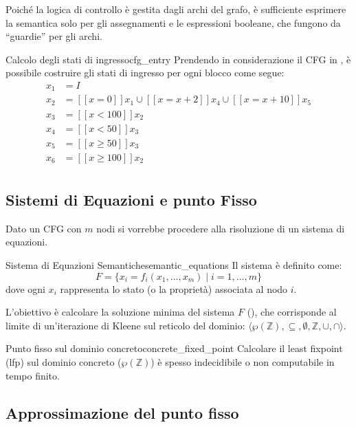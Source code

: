 Poiché la logica di controllo è gestita dagli archi del grafo, è sufficiente
esprimere la semantica solo per gli assegnamenti e le espressioni booleane,
che fungono da ``guardie'' per gli archi.


\begin{esempio}{Calcolo degli stati di ingresso}{cfg_entry}
Prendendo in considerazione il CFG in , è possibile costruire
gli stati di ingresso per ogni blocco come segue:
\[
\begin{aligned}
    x_1 & = I \\
    x_2 & = [\![ x = 0 ]\!]x_1 \cup [\![ x = x + 2 ]\!]x_4 \cup [\![ x = x + 10 ]\!]x_5 \\
    x_3 & = [\![ x < 100 ]\!]x_2 \\
    x_4 & = [\![ x < 50 ]\!]x_3 \\
    x_5 & = [\![ x \geq 50 ]\!]x_3 \\
    x_6 & = [\![ x \geq 100 ]\!]x_2 \\
\end{aligned}
\]
\end{esempio}

\subsection{Sistemi di Equazioni e punto Fisso}

Dato un CFG con $m$ nodi si vorrebbe procedere alla risoluzione di un sistema
di equazioni.

\begin{definizione}{Sistema di Equazioni Semantiche}{semantic_equations}
Il sistema è definito come:
\[ F = \{ x_i = f_i(x_1, \dots, x_m) \mid i = 1, \dots, m \} \]
dove ogni $x_i$ rappresenta lo stato (o la proprietà) associata al nodo $i$.
\end{definizione}

L'obiettivo è calcolare la soluzione minima del sistema $F$ (),
che corrisponde al limite di un'iterazione di Kleene sul reticolo del dominio:
$\langle \wp(\mathbb{Z}), \subseteq, \emptyset, \mathbb{Z}, \cup, \cap \rangle$.

\begin{nota}{Punto fisso sul dominio concreto}{concrete_fixed_point}
Calcolare il least fixpoint (lfp) sul dominio concreto ($\wp(\mathbb{Z})$) è
spesso indecidibile o non computabile in tempo finito.
\end{nota}

\subsection{Approssimazione del punto fisso}

